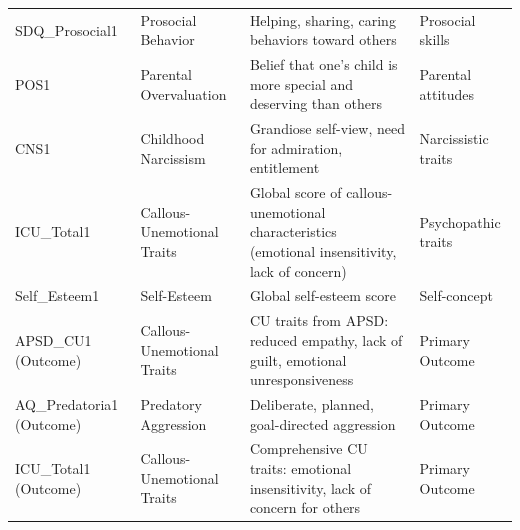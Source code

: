 \begin{longtable}{p{2.5cm} p{3cm} p{7cm} p{2.5cm}}
SDQ_Prosocial1 & Prosocial Behavior & Helping, sharing, caring behaviors toward others & Prosocial skills \\ 
POS1 & Parental Overvaluation & Belief that one's child is more special and deserving than others & Parental attitudes \\ 
CNS1 & Childhood Narcissism & Grandiose self-view, need for admiration, entitlement & Narcissistic traits \\ 
ICU_Total1 & Callous-Unemotional Traits & Global score of callous-unemotional characteristics (emotional insensitivity, lack of concern) & Psychopathic traits \\ 
Self_Esteem1 & Self-Esteem & Global self-esteem score & Self-concept \\ 
APSD_CU1 (Outcome) & Callous-Unemotional Traits & CU traits from APSD: reduced empathy, lack of guilt, emotional unresponsiveness & Primary Outcome \\ 
AQ_Predatoria1 (Outcome) & Predatory Aggression & Deliberate, planned, goal-directed aggression & Primary Outcome \\ 
ICU_Total1 (Outcome) & Callous-Unemotional Traits & Comprehensive CU traits: emotional insensitivity, lack of concern for others & Primary Outcome \\ 
\end{longtable}
